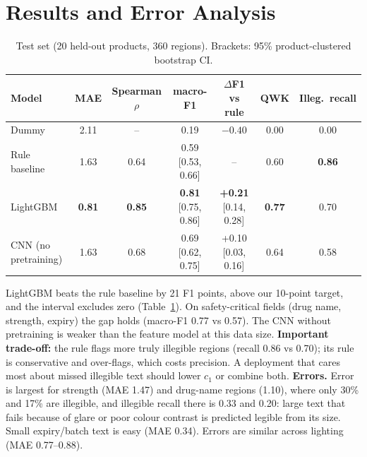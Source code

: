 \documentclass{article}
\begin{document}
\section{Results and Error Analysis}
\begin{table}[h]
\centering\small
\caption{Test set (20 held-out products, 360 regions). Brackets: 95\% product-clustered bootstrap CI.}
\label{tab:main}
\begin{tabular}{lcccccc}
\toprule
Model & MAE & Spearman $\rho$ & macro-F1 & $\Delta$F1 vs rule & QWK & Illeg.\ recall\\
\midrule
Dummy & 2.11 & -- & 0.19 & $-0.40$ & 0.00 & 0.00\\
Rule baseline & 1.63 & 0.64 & 0.59 [0.53, 0.66] & -- & 0.60 & \textbf{0.86}\\
LightGBM & \textbf{0.81} & \textbf{0.85} & \textbf{0.81} [0.75, 0.86] & \textbf{+0.21} [0.14, 0.28] & \textbf{0.77} & 0.70\\
CNN (no pretraining) & 1.63 & 0.68 & 0.69 [0.62, 0.75] & +0.10 [0.03, 0.16] & 0.64 & 0.58\\
\bottomrule
\end{tabular}
\end{table}
LightGBM beats the rule baseline by 21 F1 points, above our 10-point target, and the interval excludes zero (Table~\ref{tab:main}).
On safety-critical fields (drug name, strength, expiry) the gap holds (macro-F1 0.77 vs 0.57). The CNN without pretraining
is weaker than the feature model at this data size. \textbf{Important trade-off:} the rule flags more truly illegible
regions (recall 0.86 vs 0.70); its rule is conservative and over-flags, which costs precision. A deployment that cares most
about missed illegible text should lower $c_1$ or combine both. \textbf{Errors.} Error is largest for strength (MAE 1.47)
and drug-name regions (1.10), where only 30\% and 17\% are illegible, and illegible recall there is 0.33 and 0.20: large
text that fails because of glare or poor colour contrast is predicted legible from its size. Small expiry/batch text is easy
(MAE 0.34). Errors are similar across lighting (MAE 0.77--0.88).
\end{document}
